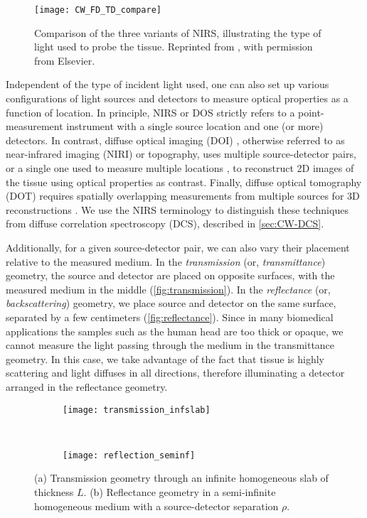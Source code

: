 \begin{figure}[tb]
\centering
\texttt{[image: CW\_FD\_TD\_compare]}
\caption{Comparison of the three variants of NIRS, illustrating the type of light used to probe the tissue. Reprinted from \cite{Scholkmann2013}, with permission from Elsevier.}
\label{fig:CW_FD_TD_comparison}
\end{figure}

Independent of the type of incident light used, one can also set up various configurations of light sources and detectors to measure optical properties as a function of location. In principle, NIRS or DOS strictly refers to a point-measurement instrument with a single source location and one (or more) detectors. In contrast, diffuse optical imaging (DOI) \cite{Strangman2002}, otherwise referred to as near-infrared imaging (NIRI) or topography, \cite{Scholkmann2013} uses multiple source-detector pairs, or a single one used to measure multiple locations \cite[ch. 9.1.4]{Handbook}, to reconstruct 2D images of the tissue using optical properties as contrast. Finally, diffuse optical tomography (DOT) requires spatially overlapping measurements from multiple sources for 3D reconstructions \cite[ch. 2.4.2]{Madsen2013}. We use the NIRS terminology to distinguish these techniques from diffuse correlation spectroscopy (DCS), described in \autoref{sec:CW-DCS}. 

Additionally, for a given source-detector pair, we can also vary their placement relative to the measured medium. In the \emph{transmission} (or, \emph{transmittance}) geometry, the source and detector are placed on opposite surfaces, with the measured medium in the middle (\autoref{fig:transmission}). In the \emph{reflectance} (or, \emph{backscattering}) geometry, we place source and detector on the same surface, separated by a few centimeters (\autoref{fig:reflectance}). Since in many biomedical applications the samples such as the human head are too thick or opaque, we cannot measure the light passing through the medium in the transmittance geometry. In this case, we take advantage of the fact that tissue is highly scattering and light diffuses in all directions, therefore illuminating a detector arranged in the reflectance geometry. 

\begin{figure}[tb]
        \centering
    \begin{subfigure}{0.49\textwidth}
        \centering
        \texttt{[image: transmission\_infslab]}
        \caption{}
        \label{fig:transmission}
    \end{subfigure}~%
    \begin{subfigure}{0.49\textwidth}
        \centering
        \texttt{[image: reflection\_seminf]}
        \caption{}
        \label{fig:reflectance}
    \end{subfigure}  
    \caption{(a) Transmission geometry through an infinite homogeneous slab of thickness $L$. (b) Reflectance geometry in a semi-infinite homogeneous medium with a source-detector separation $\rho$.}
    \label{fig:geometry}
\end{figure}

